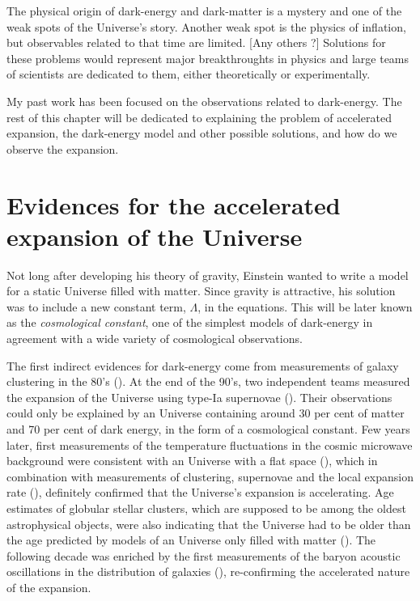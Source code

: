     The physical origin of dark-energy and dark-matter is a mystery and one of the weak spots 
    of the Universe's story. Another weak spot is the physics of inflation, but observables 
    related to that time are limited. [Any others ?] Solutions for these problems 
    would represent major breakthroughts in physics and large teams of scientists are dedicated
    to them, either theoretically or experimentally. 

    My past work has been focused on the observations related to dark-energy. 
    The rest of this chapter will be dedicated to explaining the problem 
    of accelerated expansion, the dark-energy model and other possible solutions,
    and how do we observe the expansion. 

\section{Evidences for the accelerated expansion of the Universe}
\label{intro:evidences_acceleration}

    Not long after developing his theory of gravity, Einstein wanted to write a model 
    for a static Universe filled with matter. Since gravity is attractive, his solution 
    was to include a new constant term, $\Lambda$, in the equations. This will be later
    known as the \emph{cosmological constant}, one of the simplest models of dark-energy
    in agreement with a wide variety of cosmological observations. 
    
    The first indirect evidences for dark-energy come from measurements of galaxy clustering in 
    the 80's (\cite{maddoxGalaxyCorrelationsLarge1990, 
    efstathiouCosmologicalConstantCold1990}). 
    At the end of the 90's, two independent teams measured the expansion of 
    the Universe using type-Ia supernovae 
    (\cite{riessObservationalEvidenceSupernovae1998, perlmutterMeasurementsOmegaLambda1999}). 
    Their observations could only be explained by 
    an Universe containing around 30 per cent of matter and 70 per cent of dark energy,
    in the form of a cosmological constant. Few years later, first measurements of the 
    temperature fluctuations in the cosmic microwave background were consistent with 
    an Universe with a flat space (\cite{balbiConstraintsCosmologicalParameters2000,
    debernardisFlatUniverse2000}), 
    which in combination with measurements of clustering, 
    supernovae and the local expansion rate (\cite{mouldHubbleSpaceTelescope2000}), 
    definitely confirmed that the Universe's expansion is accelerating. 
    Age estimates of globular stellar clusters, which are
    supposed to be among the oldest astrophysical objects, were also indicating that 
    the Universe had to be older than the age predicted by models of an Universe only 
    filled with matter (\cite{chaboyerAgeUniverse1998}). 
    The following decade was enriched by the first measurements
    of the baryon acoustic oscillations in the distribution of galaxies
    (\cite{eisensteinDetectionBaryonAcoustic2005, cole2dFGalaxyRedshift2005}),
    re-confirming the accelerated nature of the expansion.
    
